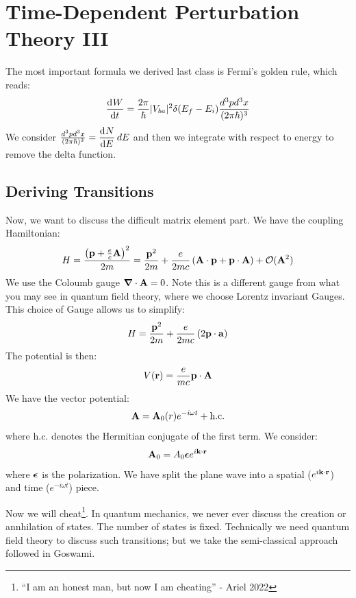 \section{Time-Dependent Perturbation Theory III}
The most important formula we derived last class is Fermi's golden rule, which reads:
\begin{equation}
    \dod{W}{t} = \frac{2\pi}{\hbar}\abs{V_{ba}}^2\delta(E_f - E_i)\frac{d^3pd^3x}{(2\pi\hbar)^3}
\end{equation}
We consider $\frac{d^3pd^3x}{(2\pi\hbar)^3} = \dod{N}{E}dE$ and then we integrate with respect to energy to remove the delta function.

\subsection{Deriving Transitions}
Now, we want to discuss the difficult matrix element part. We have the coupling Hamiltonian:
\begin{equation}
    H = \frac{\left(\mathbf{p} + \frac{e}{c}\mathbf{A}\right)^2}{2m} = \frac{\mathbf{p}^2}{2m} + \frac{e}{2mc}\left(\mathbf{A}\cdot \mathbf{p} + \mathbf{p} \cdot \mathbf{A}\right) + \mathcal{O}(\mathbf{A}^2)
\end{equation}
We use the Coloumb gauge $\nabla \cdot \v{A} = 0$. Note this is a different gauge from what you may see in quantum field theory, where we choose Lorentz invariant Gauges. This choice of Gauge allows us to simplify:
\begin{equation}
    H = \frac{\mathbf{p}^2}{2m} + \frac{e}{2mc}\left(2\mathbf{p}\cdot\mathbf{a}\right)
\end{equation}
The potential is then:
\begin{equation}
    V(\mathbf{r}) = \frac{e}{mc}\mathbf{p} \cdot \mathbf{A}
\end{equation}
We have the vector potential:
\begin{equation}
    \mathbf{A} = \mathbf{A}_0(r)e^{-i\omega t} + \text{h.c.}
\end{equation}
where h.c. denotes the Hermitian conjugate of the first term. We consider:
\begin{equation}
    \mathbf{A}_0 = A_0\mbox{\boldmath$ \epsilon $}e^{i\mathbf{k} \cdot \mathbf{r}}
\end{equation}
where $\mbox{\boldmath$ \epsilon $}$ is the polarization. We have split the plane wave into a spatial ($e^{i\mathbf{k} \cdot \mathbf{r}}$) and time ($e^{-i\omega t}$) piece. 

Now we will cheat\footnote{``I am an honest man, but now I am cheating'' - Ariel 2022}. In quantum mechanics, we never ever discuss the creation or annhilation of states. The number of states is fixed. Technically we need quantum field theory to discuss such transitions; but we take the semi-classical approach followed in Goswami.


